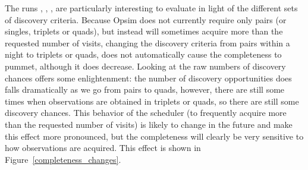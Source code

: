 The runs , ,
, 
are particularly interesting to evaluate in light of the different
sets of discovery criteria. Because Opsim does not currently require
only pairs (or singles, triplets or quads), but instead will sometimes
acquire more than the requested number of visits, changing the
discovery criteria from pairs within a night to triplets or quads,
does not automatically cause the completeness to pummet, although it
does decrease. Looking at the raw numbers of discovery chances offers some
enlightenment: the number of discovery opportunities does falls dramatically as we go from pairs to quads, however, there
are still some times when observations are obtained in triplets or
quads, so there are still some discovery chances. This behavior of the
scheduler (to frequently acquire more than the requested number of
visits) is likely to change in the future and make this effect more pronounced, but the completeness will
clearly be very sensitive to how observations are acquired. This effect is shown in
Figure~\ref{completeness_changes}.

